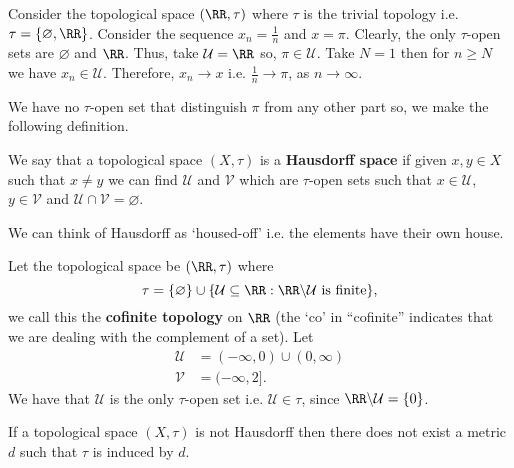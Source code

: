 \documentclass[12pt, a4paper]{article}
\begin{document}
\begin{example}
    Consider the topological space \((\RR,\tau)\) where \(\tau\) is the trivial topology i.e. \(\tau = \{\varnothing, \RR\}\). Consider the sequence \(x_n = \frac{1}{n}\) and \(x = \pi\). Clearly, the only \(\tau\)-open sets are \(\varnothing\) and \(\RR\). Thus, take \(\mathcal{U} = \RR\) so, \(\pi \in \mathcal{U}\). Take \(N =1\) then for \(n \geq N\) we have \(x_n \in \mathcal{U}\). Therefore, \(x_n \to x\) i.e. \(\frac{1}{n} \to \pi\), as \(n \to \infty\).
\end{example}

\begin{mdremark}
    We have no \(\tau\)-open set that distinguish \(\pi\) from any other part so, we make the following definition.
\end{mdremark}

\begin{definition}
    We say that a topological space \((X,\tau)\) is a \textbf{Hausdorff space} if given \(x,y \in X\) such that \(x \neq y\) we can find \(\mathcal{U}\) and \(\mathcal{V}\) which are \(\tau\)-open sets such that \(x \in \mathcal{U}\), \(y \in \mathcal{V}\) and \(\mathcal{U} \cap \mathcal{V} = \varnothing\).
\end{definition}

\begin{mdnote}
    We can think of Hausdorff as `housed-off' i.e. the elements have their own house.
\end{mdnote}

\begin{mdexample}
    Let the topological space be \((\RR,\tau)\) where 
    \[\tau = \{ \varnothing \} \cup \{ \mathcal{U} \subseteq \RR : \RR \backslash \mathcal{U} \text{ is finite} \},\]
    we call this the \textbf{cofinite topology} on \(\RR\) (the `co' in ``cofinite'' indicates that we are dealing with the complement of a set). Let 
    \[\begin{aligned}
        \mathcal{U} &= (-\infty,0) \cup (0,\infty) \\
        \mathcal{V} &= (-\infty,2].
    \end{aligned}\]
    We have that \(\mathcal{U}\) is the only \(\tau\)-open set i.e. \(\mathcal{U} \in \tau\), since \(\RR \backslash \mathcal{U} = \{0\}\).
\end{mdexample} 

\begin{mdthm}
    If a topological space \((X,\tau)\) is not Hausdorff then there does not exist a metric \(d\) such that \(\tau\) is induced by \(d\).
\end{mdthm}
\end{document}
